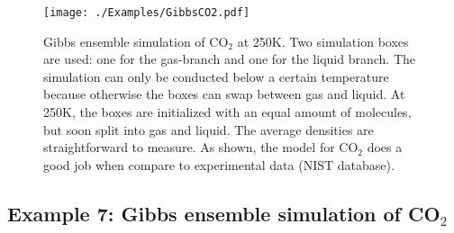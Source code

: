 \begin{figure}[t]
  \centering
  \texttt{[image: ./Examples/GibbsCO2.pdf]}
  \caption{Gibbs ensemble simulation of CO$_2$ at 250K. Two simulation boxes are used: one for the gas-branch and one for the liquid branch. The simulation can
           only be conducted below a certain temperature because otherwise the boxes can swap between gas and liquid. At 250K, the boxes are initialized
           with an equal amount of molecules, but soon split into gas and liquid. The average densities are straightforward to measure. As shown, the
           model for CO$_2$ does a good job when compare to experimental data (NIST database).}
  \label{Fig: Gibbs CO2}
\end{figure}

\subsection*{Example 7: Gibbs ensemble simulation of CO$_2$}

